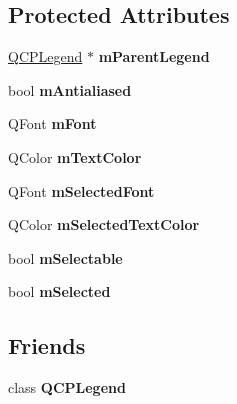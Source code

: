 \subsection*{Protected Attributes}
\begin{DoxyCompactItemize}
\item 
\hypertarget{classQCPAbstractLegendItem_aafcd9fc6fcb10f4a8d46037011afafe8}{\hyperlink{classQCPLegend}{Q\-C\-P\-Legend} $\ast$ {\bfseries m\-Parent\-Legend}}\label{classQCPAbstractLegendItem_aafcd9fc6fcb10f4a8d46037011afafe8}

\item 
\hypertarget{classQCPAbstractLegendItem_a796a604ca3309960968aec8067bfc327}{bool {\bfseries m\-Antialiased}}\label{classQCPAbstractLegendItem_a796a604ca3309960968aec8067bfc327}

\item 
\hypertarget{classQCPAbstractLegendItem_ae916a78ac0d2a60e20a17ca2f24f9754}{Q\-Font {\bfseries m\-Font}}\label{classQCPAbstractLegendItem_ae916a78ac0d2a60e20a17ca2f24f9754}

\item 
\hypertarget{classQCPAbstractLegendItem_a974b21e9930227d281344bd2242d289d}{Q\-Color {\bfseries m\-Text\-Color}}\label{classQCPAbstractLegendItem_a974b21e9930227d281344bd2242d289d}

\item 
\hypertarget{classQCPAbstractLegendItem_ab971df604306b192875a7d097feb1e21}{Q\-Font {\bfseries m\-Selected\-Font}}\label{classQCPAbstractLegendItem_ab971df604306b192875a7d097feb1e21}

\item 
\hypertarget{classQCPAbstractLegendItem_a4965c13854d970b24c284f0a4f005fbd}{Q\-Color {\bfseries m\-Selected\-Text\-Color}}\label{classQCPAbstractLegendItem_a4965c13854d970b24c284f0a4f005fbd}

\item 
\hypertarget{classQCPAbstractLegendItem_aa84029f57b1b32f642fb7db63c3fc2c2}{bool {\bfseries m\-Selectable}}\label{classQCPAbstractLegendItem_aa84029f57b1b32f642fb7db63c3fc2c2}

\item 
\hypertarget{classQCPAbstractLegendItem_ae58ebebbd0c36cc6fe897483369984d2}{bool {\bfseries m\-Selected}}\label{classQCPAbstractLegendItem_ae58ebebbd0c36cc6fe897483369984d2}

\end{DoxyCompactItemize}
\subsection*{Friends}
\begin{DoxyCompactItemize}
\item 
\hypertarget{classQCPAbstractLegendItem_a8429035e7adfbd7f05805a6530ad5e3b}{class {\bfseries Q\-C\-P\-Legend}}\label{classQCPAbstractLegendItem_a8429035e7adfbd7f05805a6530ad5e3b}

\end{DoxyCompactItemize}



